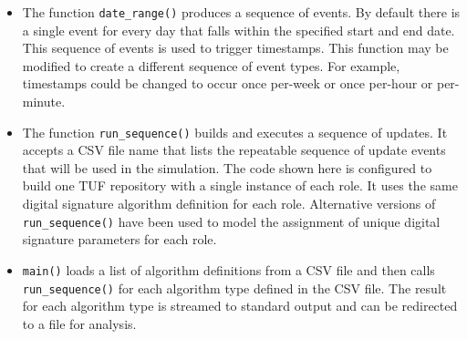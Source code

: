 \documentclass{article}
\begin{document}
\begin{itemize}
\item The function \texttt{date\_range()} produces a sequence of events.  By default there is a single event for every day that falls within the specified start and end date.  This sequence of events is used to trigger timestamps.  This function may be modified to create a different sequence of event types.  For example, timestamps could be changed to occur once per-week or once per-hour or per-minute.
\item The function \texttt{run\_sequence()} builds and executes a sequence of updates.  It accepts a CSV file name that lists the repeatable sequence of update events that will be used in the simulation.  The code shown here is configured to build one TUF repository with a single instance of each role.  It uses the same digital signature algorithm definition for each role.  Alternative versions of \texttt{run\_sequence()} have been used to model the assignment of unique digital signature parameters for each role.  
\item \texttt{main()} loads a list of algorithm definitions from a CSV file and then calls \texttt{run\_sequence()} for each algorithm type defined in the CSV file.  The result for each algorithm type is streamed to standard output and can be redirected to a file for analysis.  
\end{itemize}
\end{document}
